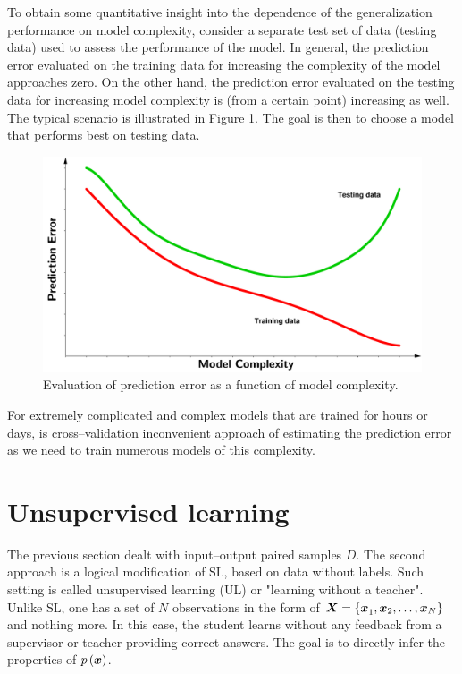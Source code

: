 To obtain some quantitative insight into the dependence of the generalization performance on model complexity, consider a separate test set of data (testing data) used to assess the performance of the model. 
In general, the prediction error evaluated on the training data for increasing the complexity of the model approaches zero. On the other hand, the prediction error evaluated on the testing data for increasing model complexity is (from a certain point) increasing as well. The typical scenario is illustrated in Figure \ref{fig:Prediction_error}. The goal is then to choose a model that performs best on testing data.
 \begin{figure}[h]
	\centering
	\includegraphics[width=16.0cm]{plots/Images/PE3.pdf}
	\caption{Evaluation of prediction error as a function of model complexity.}%
	\label{fig:Prediction_error}%
\end{figure}
For extremely complicated and complex models that are trained for hours or days, is cross--validation inconvenient approach of estimating the prediction error as we need to train numerous models of this complexity.
\section{Unsupervised learning}
The previous section dealt with input--output paired samples $D$. The second approach is a logical modification of SL, based on data without labels. Such setting is called unsupervised learning (UL) or "learning without a teacher". Unlike SL, one has a set of $N$ observations in the form of $\boldsymbol{X} = \left\lbrace \boldsymbol{x}_1^{}, \boldsymbol{x}_2,\dots, \boldsymbol{x}_N\right\rbrace$ and nothing more. In this case, the student learns without any feedback from a supervisor or teacher providing correct answers. The goal is to directly infer the properties of $p\left( \boldsymbol{x} \right)$.




